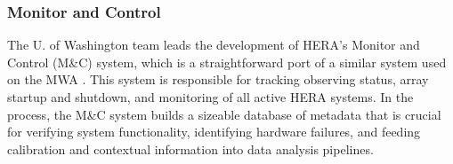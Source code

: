 \documentclass[preprint]{aastex}
\newcommand{\compress}{\vspace{-0.3in}}
\begin{document}
\compress
\subsubsection{Monitor and Control}
\label{sec:monitor}

The U. of Washington team leads the development of HERA's Monitor and Control (M\&C) system,
which is a straightforward port of a similar system used on the MWA \citep{tingay_et_al2013_trunc}.
This system is
responsible for tracking observing status, array startup and shutdown, and
monitoring of all active HERA systems. In the process, the M\&C system builds a sizeable database of 
metadata that is crucial for verifying system functionality, identifying hardware failures, and feeding
calibration and contextual information into data analysis pipelines.  


%
%
\end{document}
